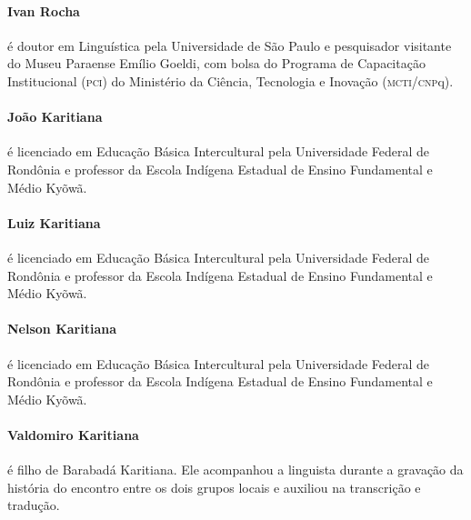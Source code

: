 \paragraph{Ivan Rocha} é doutor em Linguística pela Universidade de São Paulo e
pesquisador visitante do Museu Paraense Emílio Goeldi, com bolsa do
Programa de Capacitação Institucional (\textsc{pci}) do Ministério da Ciência,
Tecnologia e Inovação (\textsc{mcti}/\textsc{cnp}q).

\paragraph{João Karitiana} é licenciado em Educação Básica Intercultural pela
Universidade Federal de Rondônia e professor da Escola Indígena Estadual
de Ensino Fundamental e Médio Kyõwã.

\paragraph{Luiz Karitiana} é licenciado em Educação Básica Intercultural pela
Universidade Federal de Rondônia e professor da Escola Indígena Estadual
de Ensino Fundamental e Médio Kyõwã.

\paragraph{Nelson Karitiana} é licenciado em Educação Básica Intercultural pela
Universidade Federal de Rondônia e professor da Escola Indígena Estadual
de Ensino Fundamental e Médio Kyõwã.

\paragraph{Valdomiro Karitiana} é filho de Barabadá Karitiana. Ele acompanhou a
linguista durante a gravação da história do encontro entre os dois
grupos locais e auxiliou na transcrição e tradução.

\begin{comment}
(Quarta-capa)

Então ele (Moraes) morreu, a doença do branco o matou

Então meu finado pai se juntou

Quando o Moraes morreu, nós ficamos juntos

Nunca mais nos separamos

Assim nós ficamos, assim

Não havia mais homens quando ele morreu

Os homens ficaram com o meu pai

O meu finado pai trouxe todos para cá

Então o meu pai morreu aqui

Então eles não foram mais na aldeia deles

Aqui meu finado pai morreu

Assim o pessoal ficou junto

Não existe mais o que contar, esse é o final
\end{comment}


